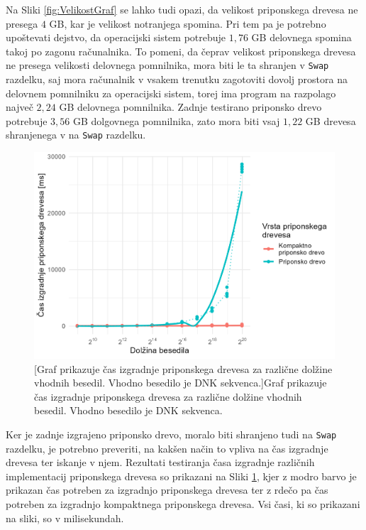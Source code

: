 Na Sliki \ref{fig:VelikostGraf} se lahko tudi opazi, da velikost priponskega drevesa ne presega $4$ GB, kar je velikost notranjega spomina. Pri tem pa je potrebno upoštevati dejstvo, da operacijski sistem potrebuje $1,76$ GB delovnega spomina takoj po zagonu računalnika. To pomeni, da čeprav velikost priponskega drevesa ne presega velikosti delovnega pomnilnika, mora biti le ta shranjen v \verb|Swap| razdelku, saj mora računalnik v vsakem trenutku zagotoviti dovolj prostora na delovnem pomnilniku za operacijski sistem, torej ima program na razpolago največ $2,24$ GB delovnega pomnilnika. Zadnje testirano priponsko drevo potrebuje $3,56$ GB dolgovnega pomnilnika, zato mora biti vsaj $1,22$ GB drevesa shranjenega v na \verb|Swap| razdelku.

\begin{figure}[htb]
    \centering
    \includegraphics[width=\textwidth]{Slike/izgradnjaDrecvesaNovPC.png}
    [Graf prikazuje čas izgradnje priponskega drevesa za različne dolžine vhodnih besedil. Vhodno besedilo je DNK sekvenca.]{Graf prikazuje čas izgradnje priponskega drevesa za različne dolžine vhodnih besedil. Vhodno besedilo je DNK sekvenca.} 
    \label{fig:IzgradnjaGraf}
\end{figure}

Ker je zadnje izgrajeno priponsko drevo, moralo biti shranjeno tudi na \verb|Swap| razdelku, je potrebno preveriti, na kakšen način to vpliva na čas izgradnje drevesa ter iskanje v njem. Rezultati testiranja časa izgradnje različnih implementacij priponskega drevesa so prikazani na Sliki \ref{fig:IzgradnjaGraf}, kjer z modro barvo je prikazan čas potreben za izgradnjo priponskega drevesa ter z rdečo pa čas potreben za izgradnjo kompaktnega priponskega drevesa. Vsi časi, ki so prikazani na sliki, so v milisekundah.

